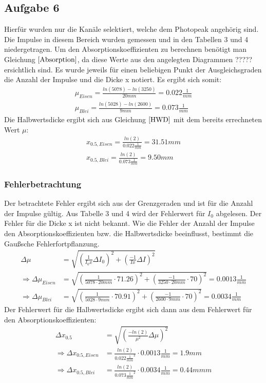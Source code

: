 \documentclass[11pt,a4paper]{article}
\begin{document}
  \subsection{Aufgabe 6}
  Hierfür wurden nur die Kanäle selektiert, welche dem Photopeak angehörig sind. Die Impulse in diesem Bereich wurden gemessen und in den Tabellen 3 und 4 niedergetragen. 
  Um den Absorptionskoeffizienten zu berechnen benötigt man Gleichung $\ref{Absorption}$, da diese Werte aus den angelegten Diagrammen ????? ersichtlich sind.
  Es wurde jeweils für einen beliebigen Punkt der Ausgleichsgraden die Anzahl der Impulse und die Dicke x notiert.
  Es ergibt sich somit:
  \begin{align}
  	\mu_{Eisen} = \frac{ln(5078)-ln(3250)}{20mm}= 0.022 \frac{1}{mm}
  	\\\mu_{Blei} = \frac{ln(5028)-ln(2600)}{9mm}= 0.073 \frac{1}{mm}
  \end{align}
  Die Halbwertsdicke ergibt sich aus Gleichung $\ref{HWD}$ mit dem bereits errechneten Wert $\mu$:
  \begin{align}
  	x_{0.5,Eisen} = \frac{ln(2)}{0.022 \frac{1}{mm}} = 31.51mm
  	\\x_{0.5, Blei} = \frac{ln(2)}{0.073 \frac{1}{mm}} = 9.50mm
  \end{align}
  
  \subsubsection{Fehlerbetrachtung}  
  Der betrachtete Fehler ergibt sich aus der Grenzgeraden und ist für die Anzahl der Impulse gültig. 
  Aus Tabelle 3 und 4 wird der Fehlerwert f\"ur $I_0$ abgelesen.
  Der Fehler für die Dicke x ist nicht bekannt.
  Wie die Fehler der Anzahl der Impulse den Absorptionskoeffizienten bzw. die Halbwertsdicke beeinflusst, bestimmt die Gau\ss sche Fehlerfortpflanzung.
  \begin{align}
  	\Delta \mu &= \sqrt{\left(\frac{1}{I_0x}\Delta I_0\right)^2+\left(\frac{-1}{Ix}\Delta I\right)^2}
  	\\\Rightarrow \Delta \mu_{Eisen} &= \sqrt{\left(\frac{1}{5078\cdot 20mm} \cdot 71.26\right)^2+\left(\frac{-1}{3250\cdot 20mm}\cdot 70\right)^2}= 0.0013 \frac{1}{mm}
  	\\\Rightarrow \Delta \mu_{Blei} &= \sqrt{\left(\frac{1}{5028\cdot 9mm} \cdot 70.91\right)^2+\left(\frac{-1}{2600\cdot 9mm}\cdot 70\right)^2}= 0.0034 \frac{1}{mm}
\end{align}   
Der Fehlerwert für die Halbwertsdicke ergibt sich dann aus dem Fehlerwert für den Absorptionskoeffizienten:
\begin{align}
	\Delta x_{0.5} &= \sqrt{\left(\frac{-ln(2)}{\mu^2}\Delta \mu\right)^2}
	\\\Rightarrow \Delta x_{0.5,Eisen} &= \frac{ln(2)}{0.022\frac{1}{mm}^2}\cdot 0.0013 \frac{1}{mm} = 1.9mm
	\\\Rightarrow \Delta x_{0.5,Blei} &= \frac{ln(2)}{0.073\frac{1}{mm}^2}\cdot 0.0034 \frac{1}{mm} = 0.44 mmm
\end{align}
\newpage
\end{document}
